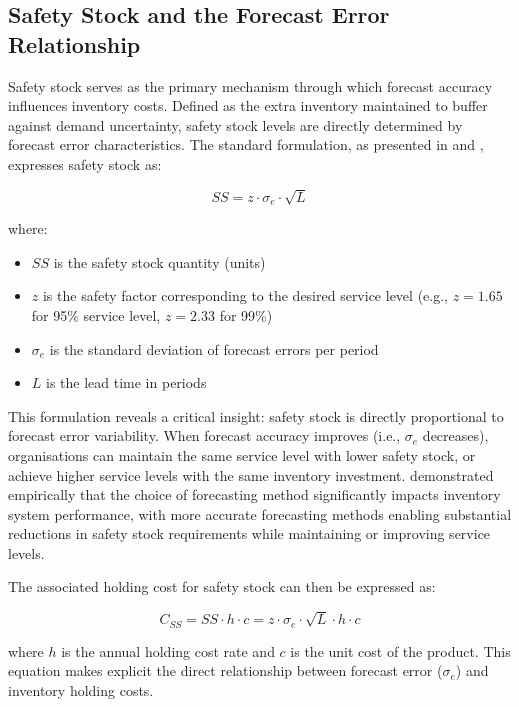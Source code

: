 \documentclass[ENG]{TFUOC}%
\begin{document}
\subsection{Safety Stock and the Forecast Error Relationship}
\label{s:safetystock}

Safety stock serves as the primary mechanism through which forecast accuracy influences inventory costs. Defined as the extra inventory maintained to buffer against demand uncertainty, safety stock levels are directly determined by forecast error characteristics. The standard formulation, as presented in \citet{silver2016inventory} and \citet{thomopoulos2015demand}, expresses safety stock as:

\begin{equation}
SS = z \cdot \sigma_e \cdot \sqrt{L}
\label{eq:safety_stock}
\end{equation}

\noindent where:
\begin{itemize}
    \item $SS$ is the safety stock quantity (units)
    \item $z$ is the safety factor corresponding to the desired service level (e.g., $z = 1.65$ for 95\% service level, $z = 2.33$ for 99\%)
    \item $\sigma_e$ is the standard deviation of forecast errors per period
    \item $L$ is the lead time in periods
\end{itemize}

This formulation reveals a critical insight: safety stock is directly proportional to forecast error variability. When forecast accuracy improves (i.e., $\sigma_e$ decreases), organisations can maintain the same service level with lower safety stock, or achieve higher service levels with the same inventory investment. \citet{tiacci2009approach} demonstrated empirically that the choice of forecasting method significantly impacts inventory system performance, with more accurate forecasting methods enabling substantial reductions in safety stock requirements while maintaining or improving service levels.

The associated holding cost for safety stock can then be expressed as:

\begin{equation}
C_{SS} = SS \cdot h \cdot c = z \cdot \sigma_e \cdot \sqrt{L} \cdot h \cdot c
\label{eq:ss_cost}
\end{equation}

\noindent where $h$ is the annual holding cost rate and $c$ is the unit cost of the product. This equation makes explicit the direct relationship between forecast error ($\sigma_e$) and inventory holding costs.
\end{document}
